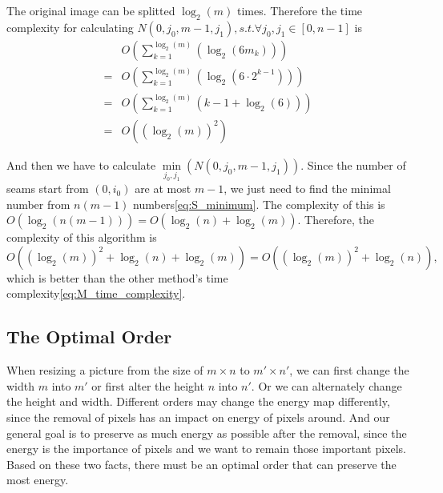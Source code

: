 \documentclass[final]{cvpr}
\begin{document}
The original image can be splitted $\log_2(m)$ times.
Therefore the time complexity for calculating $N(0,j_0,m-1,j_1),{s.t.}\forall j_0,j_1\in [0,n-1]$ is
\begin{equation}
    \begin{aligned}
        &O(\sum_{k=1}^{\log_2(m)}(\log_2(6m_k)))\\
        =&O(\sum_{k=1}^{\log_2(m)}(\log_2(6\cdot 2^{k-1})))\\
        =&O(\sum_{k=1}^{\log_2(m)}(k-1+\log_2(6)))\\
        =&O((\log_2(m))^2)
        \label{eq:N_primary_time_complexity}
    \end{aligned}
\end{equation}

And then we have to calculate $\min\limits_{j_0,j_1}(N(0,j_0,m-1,j_1))$.
Since the number of seams start from $(0,i_0)$ are at most $m-1$, we just need to find the minimal number from $n(m-1)$ numbers\ref{eq:S_minimum}.
The complexity of this is $O(\log_2(n(m-1)))=O(\log_2(n)+\log_2(m))$. Therefore, the complexity of this algorithm is
\begin{equation}
    O((\log_2(m))^2+\log_2(n)+\log_2(m))=O((\log_2(m))^2+\log_2(n)),
    \label{eq:N_time_complexity}
\end{equation}
which is better than the other method's time complexity\ref{eq:M_time_complexity}.
\subsection{The Optimal Order}
When resizing a picture from the size of $m\times n$ to $m'\times n'$, we can first change the width $m$ into $m'$ or first alter the height $n$ into $n'$.
Or we can alternately change the height and width.
Different orders may change the energy map differently, since the removal of pixels has an impact on energy of pixels around.
And our general goal is to preserve as much energy as possible after the removal, since the energy is the importance of pixels and we want to remain those important pixels.
Based on these two facts, there must be an optimal order that can preserve the most energy.
\end{document}

